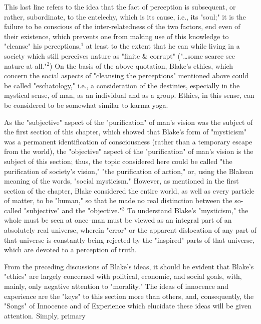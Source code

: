 This last line refers to the idea that the fact of perception is subsequent, or rather, subordinate, to the
entelechy, which is its cause, i.e., its "soul;" it is the failure to be conscious of the inter-relatedness of the two factors, end even
of their existence, which prevents one from making use of this knowledge to "cleanse" his perceptions,$^{1}$ at least
to the extent that he can while living in a society which still perceives nature as "finite \& corrupt" ("\dots some
scarce see nature at all."$^{2}$) On the basis of the above quotation, Blake's ethics, which concern the social aspects of
"cleansing the perceptions" mentioned above could be called "eschatology," i.e., a consideration of the destinies, especially in the
mystical sense, of man, as an individual and as a group. Ethics, in this sense, can be considered to be somewhat similar to karma yoga.\par
\vspace*{0.5\baselineskip}
As the "subjective" aspect of the "purification" of man's vision was the subject of the first section of this chapter, which showed that
Blake's form of "mysticism" was a permanent identification of consciousness (rather than a temporary escape from the world), the  "objective" aspect of
the "purification" of man's vision is the subject of this section; thus, the topic considered here could be called "the purification of society's vision," "the
purification of action," or, using the Blakean meaning of the words, "social mysticism." However, as mentioned in the first section of the chapter, Blake considered the entire world,
as well as every particle of matter, to be "human," so that he made no real distinction between the so-called "subjective" and the "objective."$^{3}$ To understand Blake's
"mysticism," the whole must be seen at once--man must be viewed as an integral part of an absolutely real universe, wherein "error" or the apparent dislocation of any part of that
universe is constantly being rejected by the "inspired" parts of that universe, which are devoted to a perception of truth.\par
\vspace*{0.5\baselineskip}
From the preceding discussions of Blake's ideas, it should be evident that Blake's "ethics" are largely concerned with political,
economic, and social goals, with, mainly, only negative attention to "morality." The ideas of innocence and experience are the "keys"
to this section more than others, and, consequently, the "Songs" of Innocence and of Experience which elucidate these ideas will be given attention. Simply, primary

